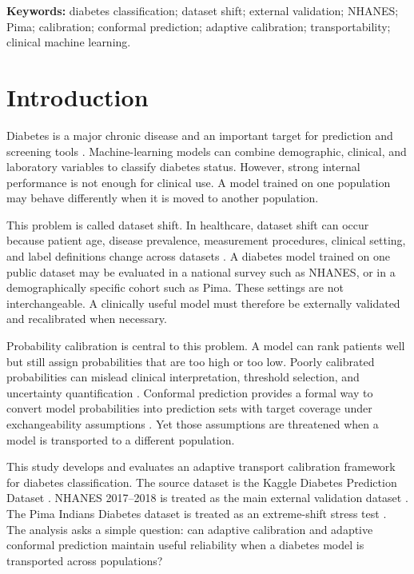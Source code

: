 \documentclass[11pt]{article}
\begin{document}
\noindent\textbf{Keywords:} diabetes classification; dataset shift; external validation; NHANES; Pima; calibration; conformal prediction; adaptive calibration; transportability; clinical machine learning.

\section{Introduction}
Diabetes is a major chronic disease and an important target for prediction and screening tools \cite{who2023diabetes}. Machine-learning models can combine demographic, clinical, and laboratory variables to classify diabetes status. However, strong internal performance is not enough for clinical use. A model trained on one population may behave differently when it is moved to another population.

This problem is called dataset shift. In healthcare, dataset shift can occur because patient age, disease prevalence, measurement procedures, clinical setting, and label definitions change across datasets \cite{datasetShift}. A diabetes model trained on one public dataset may be evaluated in a national survey such as NHANES, or in a demographically specific cohort such as Pima. These settings are not interchangeable. A clinically useful model must therefore be externally validated and recalibrated when necessary.

Probability calibration is central to this problem. A model can rank patients well but still assign probabilities that are too high or too low. Poorly calibrated probabilities can mislead clinical interpretation, threshold selection, and uncertainty quantification \cite{calibrationReview}. Conformal prediction provides a formal way to convert model probabilities into prediction sets with target coverage under exchangeability assumptions \cite{vovk2005,shafer2008,angelopoulos2023}. Yet those assumptions are threatened when a model is transported to a different population.

This study develops and evaluates an adaptive transport calibration framework for diabetes classification. The source dataset is the Kaggle Diabetes Prediction Dataset \cite{kaggleDiabetes}. NHANES 2017--2018 is treated as the main external validation dataset \cite{nhanes2018}. The Pima Indians Diabetes dataset is treated as an extreme-shift stress test \cite{pima}. The analysis asks a simple question: can adaptive calibration and adaptive conformal prediction maintain useful reliability when a diabetes model is transported across populations?
\end{document}
